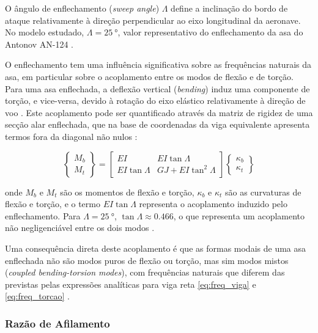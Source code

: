 \documentclass[a4paper,fleqn,noprintline]{cas-dc}
\begin{document}
O ângulo de enflechamento (\textit{sweep angle}) $\Lambda$ define a inclinação do bordo de ataque relativamente à direção perpendicular ao eixo longitudinal da aeronave. No modelo estudado, $\Lambda = \qty{25}{\degree}$, valor representativo do enflechamento da asa do Antonov AN-124 \cite{Antonov2004}.

O enflechamento tem uma influência significativa sobre as frequências naturais da asa, em particular sobre o acoplamento entre os modos de flexão e de torção. Para uma asa enflechada, a deflexão vertical (\textit{bending}) induz uma componente de torção, e vice-versa, devido à rotação do eixo elástico relativamente à direção de voo \cite{Dowell2004}. Este acoplamento pode ser quantificado através da matriz de rigidez de uma secção alar enflechada, que na base de coordenadas da viga equivalente apresenta termos fora da diagonal não nulos \cite{Hodges2011}:

\begin{equation}
    \begin{Bmatrix} M_b \\ M_t \end{Bmatrix} =
    \begin{bmatrix} 
        EI & EI\tan\Lambda \\ 
        EI\tan\Lambda & GJ + EI\tan^2\Lambda 
    \end{bmatrix}
    \begin{Bmatrix} \kappa_b \\ \kappa_t 
    \end{Bmatrix}
    \label{eq:rigidez_enflechamento}
\end{equation}

\noindent onde $M_b$ e $M_t$ são os momentos de flexão e torção, $\kappa_b$ e $\kappa_t$ são as curvaturas de flexão e torção, e o termo $EI\tan\Lambda$ representa o acoplamento induzido pelo enflechamento. Para $\Lambda = \qty{25}{\degree}$, $\tan\Lambda \approx 0.466$, o que representa um acoplamento não negligenciável entre os dois modos \cite{Bisplinghoff1996}.

Uma consequência direta deste acoplamento é que as formas modais de uma asa enflechada não são modos puros de flexão ou torção, mas sim modos mistos (\textit{coupled bending-torsion modes}), com frequências naturais que diferem das previstas pelas expressões analíticas para viga reta \eqref{eq:freq_viga} e \eqref{eq:freq_torcao} \cite{Wright2015}.

\subsubsection{Razão de Afilamento}
\end{document}
